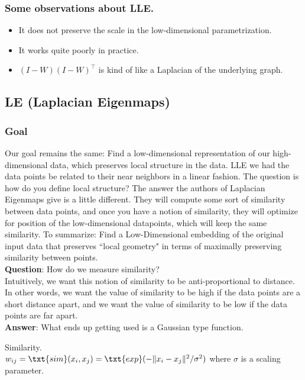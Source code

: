 \subsubsection*{Some observations about LLE.}
\begin{itemize}
\item It does not preserve the scale in the low-dimensional parametrization.
\item It works quite poorly in practice.
\item $(I-W)(I-W)^\intercal$ is kind of like a Laplacian of the underlying graph.
\end{itemize}

\subsection*{LE (Laplacian Eigenmaps)}
\subsubsection*{Goal}
Our goal remains the same: Find a low-dimensional representation of our high-dimensional data, which preserves local structure in the data. LLE we had the data points be related to their near neighbors in a linear fashion. The question is how do you define local structure? The answer the authors of Laplacian Eigenmaps give is a little different. They will compute some sort of similarity between data points, and once you have a notion of similarity, they will optimize for position of the low-dimensional datapoints, which will keep the same similarity. 
To summarize: Find a Low-Dimensional embedding of the original input data that preserves ``local geometry" in terms of maximally preserving similarity
between points.\\ 
\textbf{Question}: How do we measure similarity?\\
Intuitively, we want this notion of similarity to be anti-proportional to distance. In other words, we want the value of similarity to be high if the data points are a short distance apart, and we want the value of similarity to be low if the data points are far apart.\\
\textbf{Answer}: What ends up getting used is a Gaussian type function. 

\begin{definition} Similarity. \\
$w_{ij} = \txt{sim}(x_i, x_j) = \txt{exp}(-\|x_i - x_j\|^2/\sigma^2)$ where $\sigma$ is a scaling parameter. 
\end{definition}


